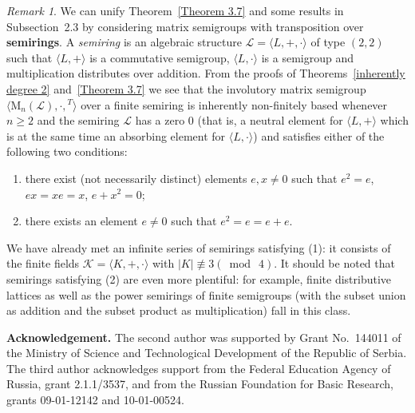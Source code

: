 \documentclass[11pt,reqno]{amsart}
\numberwithin{equation}{section}
\theoremstyle{remark}
\newtheorem{Rmk}{Remark}[section]
\begin{document}
\begin{Rmk}
We can unify Theorem~\ref{Theorem 3.7} and some results in
Subsection~2.3 by considering matrix semigroups with transposition
over \textbf{semirings}. A \emph{semiring} is an algebraic
structure $\mathcal{L}=\langle L,+,\cdot\rangle$ of type $(2,2)$
such that $\langle L,+\rangle$ is a commutative semigroup,
$\langle L,\cdot\rangle$ is a semigroup and multiplication
distributes over addition. From the proofs of
Theorems~\ref{inherently degree 2} and~\ref{Theorem 3.7} we see
that the involutory matrix semigroup
$\langle\mathrm{M}_n(\mathcal{L}),\cdot,{}^T\rangle$ over a finite
semiring is inherently non-finitely based whenever $n\ge 2$ and
the semiring $\mathcal{L}$ has a zero 0 (that is, a neutral
element for $\langle L,+\rangle$ which is at the same time an
absorbing element for $\langle L,\cdot\rangle$) and satisfies
either of the following two conditions:
\begin{enumerate}
\item there exist (not necessarily distinct) elements $e,x\ne 0$
such that $e^2=e$, $ex=xe=x$, $e+x^2=0$;
\item there exists an element $e\ne 0$ such that $e^2=e=e+e$.
\end{enumerate}
We have already met an infinite series of semirings satisfying
(1): it consists of the finite fields $\mathcal{K}=\langle
K,+,\cdot\rangle$ with $\vert K\vert\mathrel{\not\equiv 3}(\bmod\
4)$. It should be noted that semirings satisfying (2) are even
more plentiful: for example, finite distributive lattices as well
as the power semirings of finite semigroups (with the subset union
as addition and the subset product as multiplication) fall in this
class.
\end{Rmk}


\noindent\textbf{Acknowledgement.} The second author was supported
by Grant No.\ 144011 of the Ministry of Science and Technological
Development of the Republic of Serbia. The third author
acknowledges support from the Federal Education Agency of Russia,
grant 2.1.1/3537, and from the Russian Foundation for Basic
Research, grants 09-01-12142 and 10-01-00524.
\end{document}
